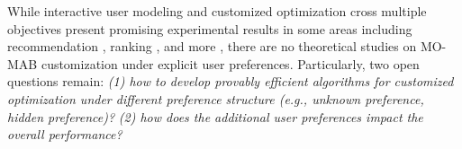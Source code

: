 


While interactive user modeling and customized optimization cross multiple objectives present promising experimental results in some areas including recommendation \cite{xie2021personalized}, ranking \cite{wanigasekara2019learning}, and more \cite{reymond2024interactively}, there are no theoretical studies on MO-MAB customization under explicit user preferences. 
Particularly, two open questions remain:
\emph{(1) how to develop provably efficient algorithms for customized optimization under different preference structure (e.g., unknown preference, hidden preference)?}
\emph{(2) how does the additional user preferences impact the overall performance?}

